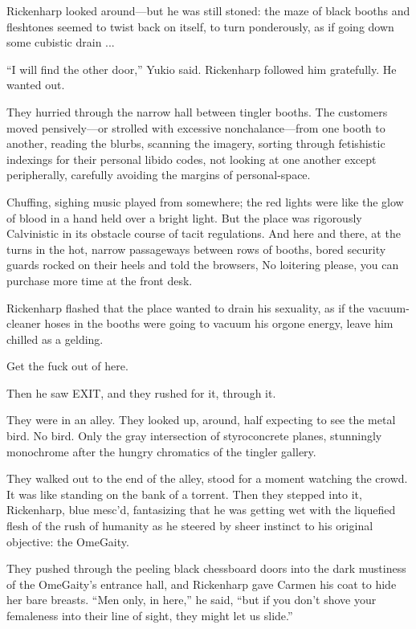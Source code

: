 Rickenharp looked around—but he was still stoned: the maze of black booths and fleshtones seemed to twist back on itself, to turn ponderously, as if going down some cubistic drain ...

``I will find the other door,'' Yukio said. Rickenharp followed him gratefully. He wanted out.

They hurried through the narrow hall between tingler booths. The customers moved pensively—or strolled with excessive nonchalance—from one booth to another, reading the blurbs, scanning the imagery, sorting through fetishistic indexings for their personal libido codes, not looking at one another except peripherally, carefully avoiding the margins of personal-space.

Chuffing, sighing music played from somewhere; the red lights were like the glow of blood in a hand held over a bright light. But the place was rigorously Calvinistic in its obstacle course of tacit regulations. And here and there, at the turns in the hot, narrow passageways between rows of booths, bored security guards rocked on their heels and told the browsers, No loitering please, you can purchase more time at the front desk.

Rickenharp flashed that the place wanted to drain his sexuality, as if the vacuum-cleaner hoses in the booths were going to vacuum his orgone energy, leave him chilled as a gelding.

Get the fuck out of here.

Then he saw EXIT, and they rushed for it, through it.

They were in an alley. They looked up, around, half expecting to see the metal bird. No bird. Only the gray intersection of styroconcrete planes, stunningly monochrome after the hungry chromatics of the tingler gallery.

They walked out to the end of the alley, stood for a moment watching the crowd. It was like standing on the bank of a torrent. Then they stepped into it, Rickenharp, blue mesc'd, fantasizing that he was getting wet with the liquefied flesh of the rush of humanity as he steered by sheer instinct to his original objective: the OmeGaity.

They pushed through the peeling black chessboard doors into the dark mustiness of the OmeGaity's entrance hall, and Rickenharp gave Carmen his coat to hide her bare breasts. ``Men only, in here,'' he said, ``but if you don't shove your femaleness into their line of sight, they might let us slide.''

